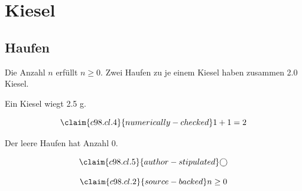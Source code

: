 \chapter{Kiesel}\label{c98}
\section{Haufen}\label{c98.s1}

\begin{theorem}[Anzahl]\label{c98.thm.count}
  Die Anzahl $n$ erfüllt $n \geq 0$.
  Zwei Haufen zu je einem Kiesel haben zusammen
  \num[c98.cl.4]{2.0}{} Kiesel.
\end{theorem}

Ein Kiesel wiegt 2.5 g.

\begin{equation}\label{c98.eq.sum}\claim{c98.cl.4}{numerically-checked}
  1 + 1 = 2
\end{equation}

\begin{lemma}[Leer]\label{c98.lem.empty}
  Der leere Haufen hat Anzahl $0$.
\end{lemma}

\begin{equation}\label{c98.eq.circle}\claim{c98.cl.5}{author-stipulated}
  \bigcirc
\end{equation}

\begin{vertiefung}[id=c98.v1, titel={T}, wozu={W}, voraussetzung={V}, zurueck={Z}]
  \begin{equation}\label{c98.eq.page}\claim{c98.cl.2}{source-backed}
    n \geq 0
  \end{equation}
\end{vertiefung}
